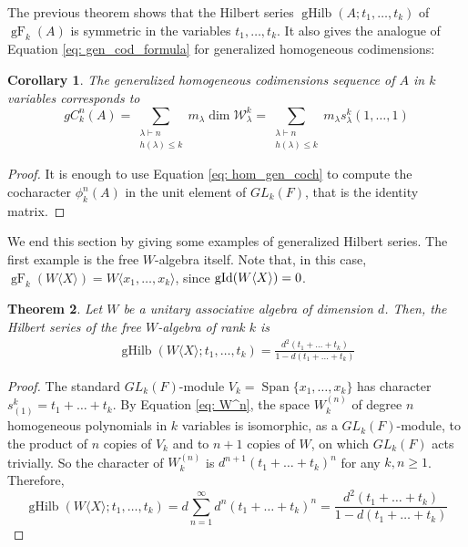 \documentclass{article}
\newtheorem{theorem}{Theorem}[section]
\newtheorem{corollary}[theorem]{Corollary}
\newcommand{\WX}{W\langle X\rangle}
\newcommand{\cW}{\mathcal{W}}
\DeclareMathOperator{\spn}{Span}
\DeclareMathOperator{\gid}{\textnormal{gId}}
\DeclareMathOperator{\Hilb}{gHilb}
\DeclareMathOperator{\F}{gF}
\begin{document}
The previous theorem shows that the Hilbert series $\Hilb(A;t_1,\dots,t_k)$ of $\F_k(A)$ is symmetric in the variables $t_1,\dots,t_k$. It also gives the analogue of Equation \eqref{eq: gen_cod_formula} for generalized homogeneous codimensions:

\begin{corollary}
	The generalized homogeneous codimensions sequence of $A$ in $k$ variables corresponds to
	\begin{equation}\label{eq: gen_hom_cod_formula}
		gC_k^n(A) = \sum_{\substack{\lambda\vdash n \\ h(\lambda)\leq k}} m_{\lambda} \dim \cW_\lambda^k  = \sum_{\substack{\lambda\vdash n \\ h(\lambda)\leq k}} m_{\lambda} s^k_\lambda(1,\dots,1) 
	\end{equation}
\end{corollary}
\begin{proof}
	It is enough to use Equation \eqref{eq: hom_gen_coch} to compute the cocharacter $\phi_k^n(A)$ in the unit element of $GL_k(F)$, that is the identity matrix.
\end{proof}

We end this section by giving some examples of generalized Hilbert series. The first example is the free $W$-algebra itself. Note that, in this case, $\F_k(\WX)=W\langle x_1,\dots,x_k\rangle$, since $\gid(\WX)=0$.

\begin{theorem}
	Let $W$ be a unitary associative algebra of dimension $d$. Then, the Hilbert series of the free $W$-algebra of rank $k$ is \begin{gather*}
		\Hilb(\WX; t_1,\dots,t_k) = \frac{d^2 (t_1+\ldots+t_k)}{1-d (t_1+\ldots +t_k)}
	\end{gather*}
\end{theorem}
\begin{proof}
	The standard $GL_k(F)$-module $V_k=\spn\{x_1,\dots,x_k\}$ has character $s^k_{(1)}= t_1+\dots + t_k$.
	By Equation \eqref{eq: W^n}, the space $W_k^{(n)}$ of degree $n$ homogeneous polynomials in $k$ variables is isomorphic, as a $GL_k(F)$-module, to the product of $n$ copies of $V_k$ and to $n+1$ copies of $W$, on which $GL_k(F)$ acts trivially. So the character of $W_k^{(n)}$ is $d^{n+1}(t_1+\dots + t_k)^n$ for any $k,n\geq 1$. Therefore,
	\[ \Hilb(\WX; t_1,\dots,t_k) = d\sum_{n=1}^{\infty} d^{n}(t_1+\dots + t_k)^n = \frac{d^2 (t_1+\ldots+t_k)}{1-d (t_1+\ldots +t_k)} \]
\end{proof}
\end{document}
